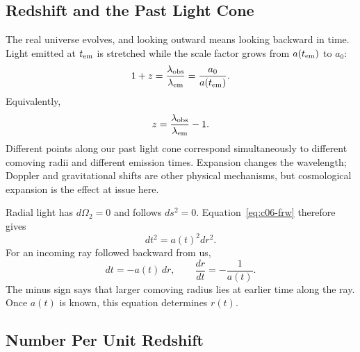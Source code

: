 \subsection{Redshift and the Past Light Cone}

The real universe evolves, and looking outward means looking backward in time. Light emitted at \(t_{\rm em}\) is stretched while the scale factor grows from \(a(t_{\rm em})\) to \(a_0\):
\begin{equation}
1+z
=\frac{\lambda_{\rm obs}}{\lambda_{\rm em}}
=\frac{a_0}{a(t_{\rm em})}.
\label{eq:c06-redshift}
\end{equation}
Equivalently,
\begin{equation}
z=\frac{\lambda_{\rm obs}}{\lambda_{\rm em}}-1.
\end{equation}
Different points along our past light cone correspond simultaneously to different comoving radii and different emission times. Expansion changes the wavelength; Doppler and gravitational shifts are other physical mechanisms, but cosmological expansion is the effect at issue here.

\begin{classroomqa}
\end{classroomqa}

Radial light has \(d\Omega_2=0\) and follows \(ds^2=0\). Equation~\eqref{eq:c06-frw} therefore gives
\begin{equation}
dt^2=a(t)^2dr^2.
\end{equation}
For an incoming ray followed backward from us,
\begin{equation}
dt=-a(t)\,dr,
\qquad
\frac{dr}{dt}=-\frac{1}{a(t)}.
\label{eq:c06-null-ray}
\end{equation}
The minus sign says that larger comoving radius lies at earlier time along the ray. Once \(a(t)\) is known, this equation determines \(r(t)\).

\subsection{Number Per Unit Redshift}

